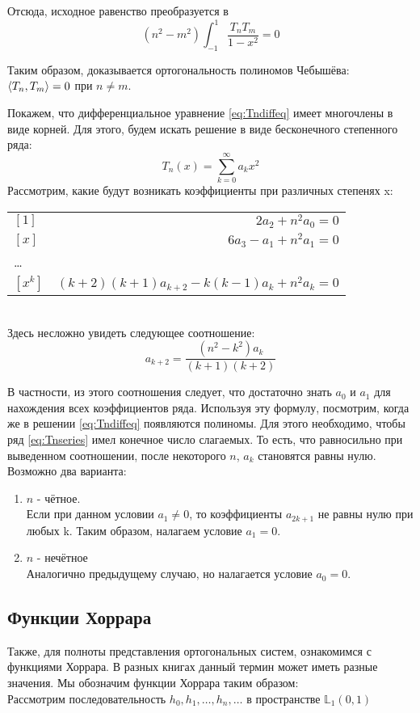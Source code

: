 	Отсюда, исходное равенство преобразуется в
	$$(n^2 - m^2) \int_{-1}^{1} \frac{T_n T_m}{1-x^2} = 0$$
	
	Таким образом, доказывается ортогональность полиномов Чебышёва: $\left\langle T_n, T_m \right\rangle = 0$ при $n \neq m$.
	
	Покажем, что дифференциальное уравнение \eqref{eq:Tndiffeq} имеет многочлены в виде корней. Для этого, будем искать
	решение в виде бесконечного степенного ряда: 
	\begin{equation} \label{eq:Tnseries}
		T_n(x) = \sum_{k=0}^{\infty} a_k x^2
	\end{equation}
	Рассмотрим, какие будут возникать коэффициенты при различных степенях x: \\
	\begin{tabular}{l r}
		$[1]$ & $ 2a_2 + n^2 a_0 = 0 $ \\
		$[x]$ & $ 6a_3 - a_1 + n^2a_1 = 0 $ \\
		\dots \\
		$[x^k]$ & $ (k+2)(k+1) a_{k+2} - k(k-1) a_k + n^2 a_k = 0 $
	\end{tabular} \\
	Здесь несложно увидеть следующее соотношение:
	$$ a_{k+2} = \frac{(n^2 - k^2) a_k}{(k+1)(k+2)}$$
	
	В частности, из этого соотношения следует, что достаточно знать $a_0$ и $a_1$ для нахождения всех коэффициентов ряда.
	Используя эту формулу, посмотрим, когда же в решении \eqref{eq:Tndiffeq} появляются полиномы. Для этого необходимо, 
	чтобы ряд \eqref{eq:Tnseries} имел конечное число слагаемых. То есть, что равносильно при выведенном соотношении, 
	после некоторого $n$, $a_k$ становятся равны нулю. Возможно два варианта:
	\begin{enumerate}
		\item $n$ - чётное. \\
		Если при данном условии $a_1 \neq 0$, то коэффициенты $a_{2k+1}$ не равны нулю при любых k. Таким образом, налагаем
		условие $a_1 = 0$.
		\item $n$ - нечётное \\
		Аналогично предыдущему случаю, но налагается условие $a_0 = 0$.
	\end{enumerate}
	
	\subsection{Функции Хоррара}
	
	Также, для полноты представления ортогональных систем, ознакомимся с функциями Хоррара. В разных книгах данный термин
	может иметь разные значения. Мы обозначим функции Хоррара таким образом: \\
	Рассмотрим последовательность $h_0, h_1, \dots, h_n, \dots$ в пространстве $\mathbb{L}_1(0, 1)$
	
